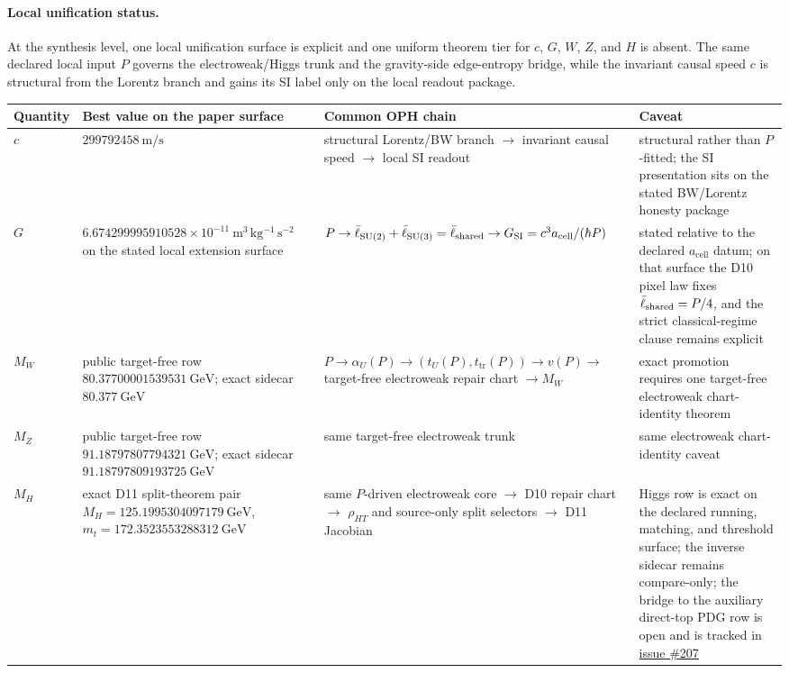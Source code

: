 \paragraph{Local unification status.}
At the synthesis level, one local unification surface is explicit and one uniform theorem tier for
\(c\), \(G\), \(W\), \(Z\), and \(H\) is absent. The same declared local input \(P\) governs the
electroweak/Higgs trunk and the gravity-side edge-entropy bridge, while the invariant causal speed
\(c\) is structural from the Lorentz branch and gains its SI label only on the local readout
package.

{\centering
\scriptsize
\setlength{\tabcolsep}{3pt}
\begin{tabular}{@{}>{\raggedright\arraybackslash}p{}>{\raggedright\arraybackslash}p{}>{\raggedright\arraybackslash}p{}>{\raggedright\arraybackslash}p{}@{}}
\toprule
Quantity & Best value on the paper surface & Common OPH chain & Caveat \\
\midrule
\(c\) & \(299792458~\mathrm{m/s}\) & structural Lorentz/BW branch \(\rightarrow\) invariant causal speed \(\rightarrow\) local SI readout & structural rather than \(P\)-fitted; the SI presentation sits on the stated BW/Lorentz honesty package \\
\(G\) & \(6.674299995910528\times10^{-11}~\mathrm{m^3\,kg^{-1}\,s^{-2}}\) on the stated local extension surface & \(P \rightarrow \bar{\ell}_{\mathrm{SU(2)}}+\bar{\ell}_{\mathrm{SU(3)}} = \bar{\ell}_{\mathrm{shared}} \rightarrow G_{\mathrm{SI}} = c^3 a_{\mathrm{cell}}/(\hbar P)\) & stated relative to the declared \(a_{\mathrm{cell}}\) datum; on that surface the D10 pixel law fixes \(\bar{\ell}_{\mathrm{shared}}=P/4\), and the strict classical-regime clause remains explicit \\
\(M_W\) & public target-free row \(80.37700001539531~\mathrm{GeV}\); exact sidecar \(80.377~\mathrm{GeV}\) & \(P \rightarrow \alpha_U(P) \rightarrow (t_U(P),t_{\mathrm{tr}}(P)) \rightarrow v(P) \rightarrow\) target-free electroweak repair chart \(\rightarrow M_W\) & exact promotion requires one target-free electroweak chart-identity theorem \\
\(M_Z\) & public target-free row \(91.18797807794321~\mathrm{GeV}\); exact sidecar \(91.18797809193725~\mathrm{GeV}\) & same target-free electroweak trunk & same electroweak chart-identity caveat \\
\(M_H\) & exact D11 split-theorem pair \(M_H=125.1995304097179~\mathrm{GeV}\), \(m_t=172.3523553288312~\mathrm{GeV}\) & same \(P\)-driven electroweak core \(\rightarrow\) D10 repair chart \(\rightarrow\) \(\rho_{HT}\) and source-only split selectors \(\rightarrow\) D11 Jacobian & Higgs row is exact on the declared running, matching, and threshold surface; the inverse sidecar remains compare-only; the bridge to the auxiliary direct-top PDG row is open and is tracked in \href{https://github.com/FloatingPragma/observer-patch-holography/issues/207}{issue \#207} \\
\bottomrule
\end{tabular}
\par}

